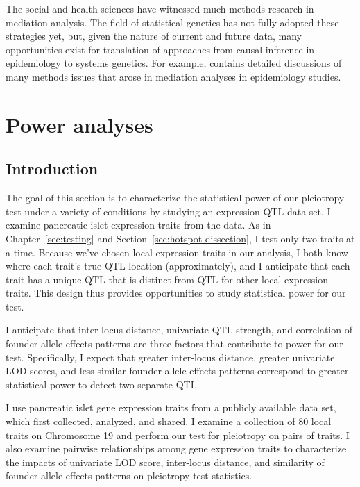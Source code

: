 \documentclass[oneside]{book}\usepackage[]{graphicx}\usepackage[]{color}
\begin{document}
The social and health sciences have witnessed much methods research in mediation analysis. 
The field of statistical genetics has not fully adopted these strategies yet, but, given the
nature of current and future data, many opportunities exist for translation of approaches from
causal inference in epidemiology to systems genetics. 
For example, \citet{vanderweele2015explanation} contains detailed discussions of many methods
issues that arose in mediation analyses in
epidemiology studies.




\section{Power analyses}\label{sec:power-analyses}

\subsection{Introduction}

The goal of this section is to characterize the statistical power of our pleiotropy test under a variety of conditions by studying an expression QTL data set. 
I examine pancreatic islet expression traits from the \citet{keller2018genetic} data. 
As in Chapter~\ref{sec:testing} and Section~\ref{sec:hotspot-dissection}, I test only two traits at a time. 
Because we’ve chosen local expression traits in our analysis, I both know where each trait’s true QTL location (approximately), 
and I anticipate that each trait has a unique QTL that is distinct from QTL for other local expression traits. 
This design thus provides opportunities to study statistical power for our test.

I anticipate that inter-locus distance, univariate QTL strength, and correlation of founder allele effects patterns are three factors that contribute to power for our test. 
Specifically, I expect that greater inter-locus distance, greater univariate LOD scores, and less similar founder allele effects patterns correspond to greater statistical power to detect two separate QTL.

I use pancreatic islet gene expression traits from a publicly available data set, which \citet{keller2018genetic} first collected, analyzed, and shared. 
I examine a collection of 80 local traits on Chromosome 19 and perform our test for pleiotropy on pairs of traits. 
I also examine pairwise relationships among gene expression traits to characterize the impacts of univariate LOD score, 
inter-locus distance, and similarity of founder allele effects patterns on pleiotropy test statistics.
\end{document}
